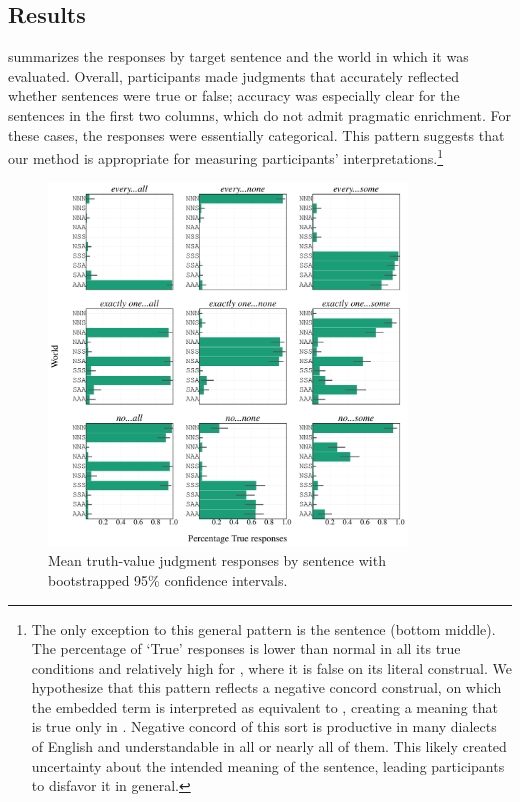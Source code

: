 \documentclass[leqno,12pt]{article}
\begin{document}

\subsection{Results}\label{sec:binary:results}

 summarizes the responses by target
sentence and the world in which it was evaluated. Overall,
participants made judgments that accurately reflected whether
sentences were true or false; accuracy was especially clear for the
sentences in the first two columns, which do not admit pragmatic
enrichment. For these cases, the responses were essentially
categorical. This pattern suggests that our method is appropriate for
measuring participants' interpretations.\footnote{The only exception
  to this general pattern is the sentence  (bottom middle). The percentage of `True' responses is
  lower than normal in all its true conditions and relatively high for
  , where it is false on its literal construal. We
  hypothesize that this pattern reflects a negative concord construal,
  on which the embedded term is interpreted as equivalent to , creating a meaning that is true only in
  . Negative concord of this sort is productive in many
  dialects of English and understandable in all or nearly all of
  them. This likely created uncertainty about the intended meaning of
  the sentence, leading participants to disfavor it in general.}

\begin{figure}[!t]
  \centering
  \includegraphics[width=0.85\textwidth]{fig/embeddedscalars-experiment-results-binary}
  \caption{Mean truth-value judgment responses by sentence with bootstrapped 95\% confidence intervals.}
  \label{fig:binary:results}
\end{figure}
\end{document}
